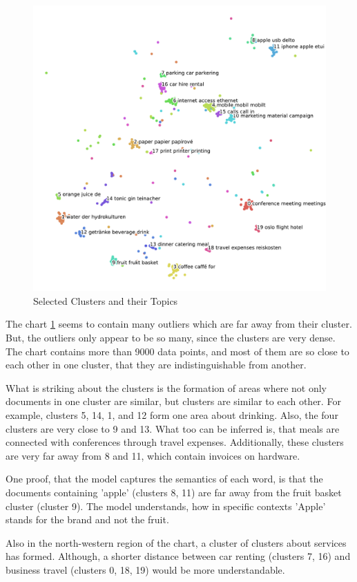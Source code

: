 \begin{figure}[!h]
	\centering
	\includegraphics[width=\textwidth]{Bilder/models/topics.pdf}
	\caption{Selected Clusters and their Topics}
	\label{fig:topics}
\end{figure}

The chart \ref{fig:topics} seems to contain many outliers which are far away from their cluster. But, the outliers only appear to be so many, since the clusters are very dense. The chart contains more than 9000 data points, and most of them are so close to each other in one cluster, that they are indistinguishable from another.

What is striking about the clusters is the formation of areas where not only documents in one cluster are similar, but clusters are similar to each other. For example, clusters 5, 14, 1, and 12 form one area about drinking. Also, the four clusters are very close to 9 and 13. What too can be inferred is, that meals are connected with conferences through travel expenses. Additionally, these clusters are very far away from 8 and 11, which contain invoices on hardware. 

One proof, that the model captures the semantics of each word, is that the documents containing 'apple' (clusters 8, 11) are far away from the fruit basket cluster (cluster 9). The model understands, how in specific contexts 'Apple' stands for the brand and not the fruit.

Also in the north-western region of the chart, a cluster of clusters about services has formed. Although, a shorter distance between car renting (clusters 7, 16) and business travel (clusters 0, 18, 19) would be more understandable.
